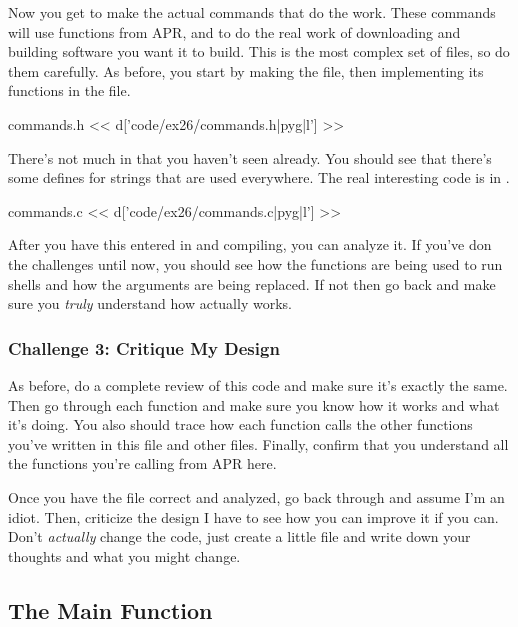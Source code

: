 Now you get to make the actual commands that do the work.  These commands
will use functions from APR,  and  to do the 
real work of downloading and building software you want it to build.
This is the most complex set of files, so do them carefully.  As before, you
start by making the  file, then implementing its functions
in the  file.

\begin{code}{commands.h}
<< d['code/ex26/commands.h|pyg|l'] >>
\end{code}

There's not much in  that you haven't seen already.  You
should see that there's some defines for strings that are used everywhere.
The real interesting code is in .

\begin{code}{commands.c}
<< d['code/ex26/commands.c|pyg|l'] >>
\end{code}

After you have this entered in and compiling, you can analyze it.  If you've
don the challenges until now, you should see how the  functions
are being used to run shells and how the arguments are being replaced.  If
not then go back and make sure you \emph{truly} understand how 
actually works.

\subsubsection{Challenge 3: Critique My Design}

As before, do a complete review of this code and make sure it's exactly
the same.  Then go through each function and make sure you know how it 
works and what it's doing.  You also should trace how each function calls
the other functions you've written in this file and other files.  Finally,
confirm that you understand all the functions you're calling from APR here.

Once you have the file correct and analyzed, go back through and assume
I'm an idiot.  Then, criticize the design I have to see how you can improve
it if you can.  Don't \emph{actually} change the code, just create a little
 file and write down your thoughts and what you might change.


\subsection{The  Main Function}

